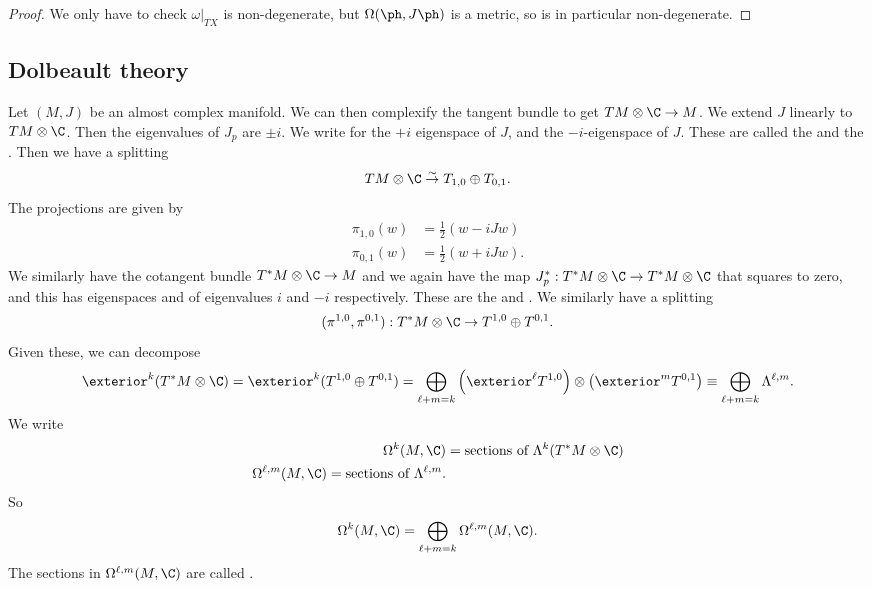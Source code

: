 \documentclass[a4paper]{article}
\begin{document}
\begin{proof}
  We only have to check $\omega|_{TX}$ is non-degenerate, but $\Omega(\ph, J\ph)$ is a metric, so is in particular non-degenerate.
\end{proof}

\subsection{Dolbeault theory}
Let $(M, J)$ be an almost complex manifold. We can then complexify the tangent bundle to get $TM \otimes \C \to M$. We extend $J$ linearly to $TM \otimes \C$. Then the eigenvalues of $J_p$ are $\pm i$. We write  for the $+i$ eigenspace of $J$, and  the $-i$-eigenspace of $J$. These are called the  and the . Then we have a splitting
\[
  TM \otimes \C \overset{\sim}{\to} T_{1, 0} \oplus T_{0, 1}.
\]
The projections are given by
\begin{align*}
  \pi_{1, 0} (w) &= \frac{1}{2} (w - i J w)\\
  \pi_{0, 1} (w) &= \frac{1}{2} (w + i J w).
\end{align*}
We similarly have the cotangent bundle $T^*M \otimes \C \to M$ and we again have the map $J_p^*: T^*M \otimes \C \to T^*M \otimes \C$ that squares to zero, and this has eigenspaces  and  of eigenvalues $i$ and $-i$ respectively. These are the  and . We similarly have a splitting
\[
  (\pi^{1, 0}, \pi^{0, 1}): T^*M \otimes \C \to T^{1, 0} \oplus T^{0, 1}.
\]
Given these, we can decompose
\[
  \exterior^k (T^* M \otimes \C) = \exterior^k (T^{1, 0} \oplus T^{0, 1}) = \bigoplus_{\ell + m = k} \left(\exterior^\ell T^{1, 0}\right) \otimes \left(\exterior^m T^{0, 1}\right) \equiv \bigoplus_{\ell + m = k} \Lambda^{\ell, m}.
\]
We write
\begin{align*}
  \Omega^k (M, \C) &= \text{sections of }\Lambda^k (T^* M \otimes \C)\\
  \Omega^{\ell, m}(M, \C) = \text{sections of }\Lambda^{\ell, m}.
\end{align*}
So
\[
  \Omega^k(M, \C) = \bigoplus_{\ell + m = k} \Omega^{\ell, m} (M, \C).
\]
The sections in $\Omega^{\ell, m}(M, \C)$ are called .
\end{document}
